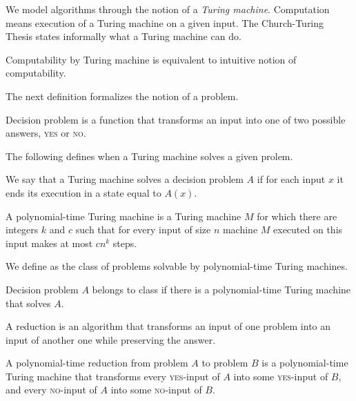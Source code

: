 We model algorithms through the notion of a \textit{Turing machine}.
Computation means execution of a Turing machine on a given input.
The Church-Turing Thesis states informally what a Turing machine can do.

\begin{cnj}
Computability by Turing machine is equivalent to intuitive notion of computability.
\end{cnj}

The next definition formalizes the notion of a problem.

\begin{defn}
Decision problem is a function that transforms an input into one of two possible answers,
\textsc{yes} or \textsc{no}.
\end{defn}

The following defines when a Turing machine solves a given prolem.

\begin{defn}
We say that a Turing machine solves a decision problem $A$ if for each input $x$
it ends its execution in a state equal to $A(x)$.
\end{defn}

\begin{defn}
A polynomial-time Turing machine is a Turing machine $M$ for which there are integers $k$ and $c$
such that for every input of size $n$ machine $M$ executed on this input makes at most $c n^k$ steps.
\end{defn}

We define \p as the class of problems solvable by polynomial-time Turing machines.

\begin{defn}[class \p]
Decision problem $A$ belongs to class \p if there is a polynomial-time Turing machine that solves $A$.
\end{defn}

A reduction is an algorithm that transforms an input of one problem
into an input of another one while preserving the answer.

\begin{defn}
A polynomial-time reduction from problem $A$ to problem $B$ is a polynomial-time Turing machine
that transforms every \textsc{yes}-input of $A$ into some \textsc{yes}-input of $B$,
and every \textsc{no}-input of $A$ into some \textsc{no}-input of $B$.
\end{defn}

